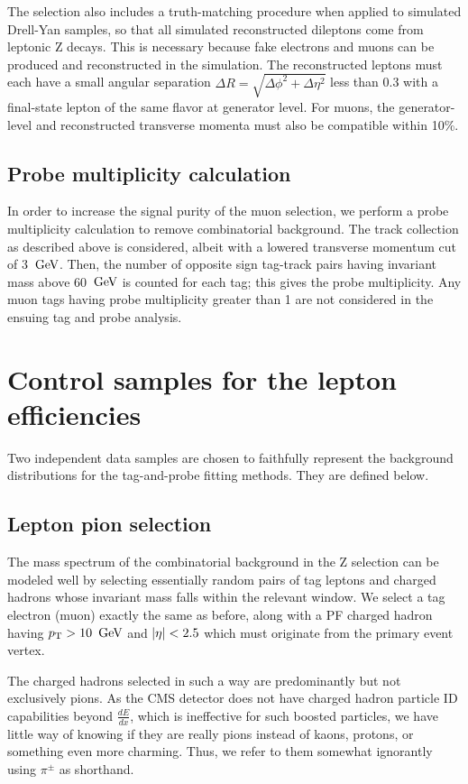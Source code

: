 The selection also includes a truth-matching procedure when applied to simulated Drell-Yan samples,
so that all simulated reconstructed dileptons come from leptonic Z decays.
This is necessary because fake electrons and muons can be produced and reconstructed in the simulation.
The reconstructed leptons must each have a small angular separation $\Delta R = \sqrt{ \Delta\phi^{2} + \Delta\eta^{2} }$ 
less than 0.3 with a final-state lepton of the same flavor at generator level. For muons, the generator-level and reconstructed
transverse momenta must also be compatible within 10\%.

\subsection{Probe multiplicity calculation}
In order to increase the signal purity of the muon selection, we perform a probe multiplicity calculation to
remove combinatorial background. The track collection as described above is considered, albeit with a 
lowered transverse momentum cut of 3 $\,\text{Ge\hspace{-.08em}V}$. Then, the number of opposite sign tag-track pairs having invariant mass above
60 $\,\text{Ge\hspace{-.08em}V}$ is counted for each tag; this gives the probe multiplicity. Any muon tags having probe multiplicity
greater than 1 are not considered in the ensuing tag and probe analysis.

\section{Control samples for the lepton efficiencies}
Two independent data samples are chosen to faithfully represent the background distributions for the
tag-and-probe fitting methods. They are defined below.
\label{sec:tnpcontrol}

\subsection{Lepton pion selection}
The mass spectrum of the combinatorial background in the Z selection can be modeled well by selecting
essentially random pairs of tag leptons and charged hadrons whose invariant mass falls within the relevant window.
We select a tag electron (muon) exactly the same as before, along with a PF charged hadron having $p_{\mathrm{T}}>10~\,\text{Ge\hspace{-.08em}V}$ and $\lvert \eta \rvert<2.5$
which must originate from the primary event vertex.

The charged hadrons selected in such a way are predominantly but not exclusively pions.
As the CMS detector does not have charged hadron particle ID capabilities beyond $\frac{dE}{dx}$,
which is ineffective for such boosted particles, we have little way of knowing if they are really pions
instead of kaons, protons, or something even more charming.
Thus, we refer to them somewhat ignorantly using $\pi^{\pm}$ as shorthand.

